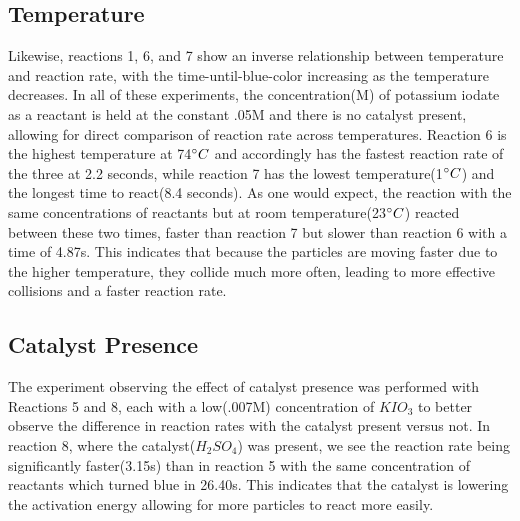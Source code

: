 \documentclass{article}
\begin{document}
\subsection{Temperature}
Likewise, reactions 1, 6, and 7 show an inverse relationship between temperature and reaction rate, with the time-until-blue-color increasing as the temperature decreases. In all of these experiments, the concentration(M) of potassium iodate as a reactant is held at the constant .05M and there is no catalyst present, allowing for direct comparison of reaction rate across temperatures. Reaction 6 is the highest temperature at 74$\degree C$ and accordingly has the fastest reaction rate of the three at 2.2 seconds, while reaction 7 has the lowest temperature(1$\degree C$) and the longest time to react(8.4 seconds).  As one would expect, the reaction with the same concentrations of reactants but at room temperature(23$\degree C$) reacted between these two times, faster than reaction 7 but slower than reaction 6 with a time of 4.87s. This indicates that because the particles are moving faster due to the higher temperature, they collide much more often, leading to more effective collisions and a faster reaction rate.
\subsection{Catalyst Presence}
The experiment observing the effect of catalyst presence was performed with Reactions 5 and 8, each with a low(.007M) concentration of $KIO_3$ to better observe the difference in reaction rates with the catalyst present versus not.  In reaction 8, where the catalyst($H_2SO_4$) was present, we see the reaction rate being significantly faster(3.15s) than in reaction 5 with the same concentration of reactants which turned blue in 26.40s. This indicates that the catalyst is lowering the activation energy allowing for more particles to react more easily.
\end{document}
